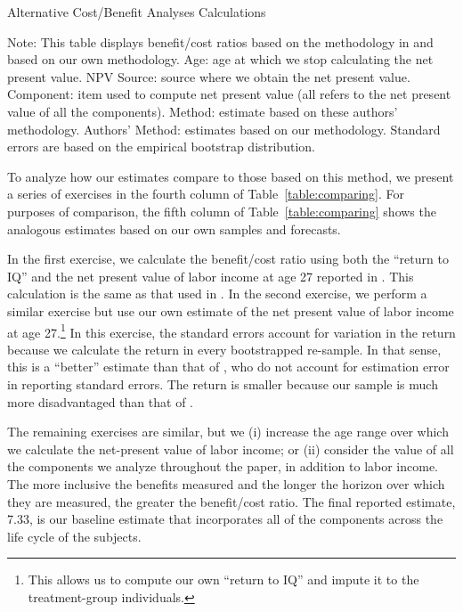 \begin{table}[!htbp]
\begin{threeparttable}
\caption{Alternative Cost/Benefit Analyses Calculations}
\label{table:comparing}
\centering
\footnotesize

\begin{tablenotes}
\footnotesize
\item Note: This table displays benefit/cost ratios based on the methodology in \citet{Kline_Walters_2016_QJE} and based on our own methodology. Age: age at which we stop calculating the net present value. NPV Source: source where we obtain the net present value. Component: item used to compute net present value (all refers to the net present value of all the components). \citet{Kline_Walters_2016_QJE} Method: estimate based on these authors' methodology. Authors' Method: estimates based on our methodology. Standard errors are based on the empirical bootstrap distribution.
\end{tablenotes}
\end{threeparttable}
\end{table}

To analyze how our estimates compare to those based on this method, we present a series of exercises in the fourth column of Table~\ref{table:comparing}. For purposes of comparison, the fifth column of Table~\ref{table:comparing} shows the analogous estimates based on our own samples and forecasts.

In the first exercise, we calculate the benefit/cost ratio using both the ``return to IQ'' and the net present value of labor income at age 27 reported in \citet{Chetty_Friedman_etal_2011_QJoE}. This calculation is the same as that used in \citet{Kline_Walters_2016_QJE}. In the second exercise, we perform a similar exercise but use our own estimate of the net present value of labor income at age 27.\footnote{This allows us to compute our own ``return to IQ'' and impute it to the treatment-group individuals.} In this exercise, the standard errors account for variation in the return because we calculate the return in every bootstrapped re-sample. In that sense, this is a ``better'' estimate than that of \citet{Kline_Walters_2016_QJE}, who do not account for estimation error in reporting standard errors. The return is smaller because our sample is much more disadvantaged than that of \citet{Chetty_Friedman_etal_2011_QJoE}.

The remaining exercises are similar, but we (i) increase the age range over which we calculate the net-present value of labor income; or (ii) consider the value of all the components we analyze throughout the paper, in addition to labor income. The more inclusive the benefits measured and the longer the horizon over which they are measured, the greater the benefit/cost ratio. The final reported estimate, 7.33, is our baseline estimate that incorporates all of the components across the life cycle of the subjects.

